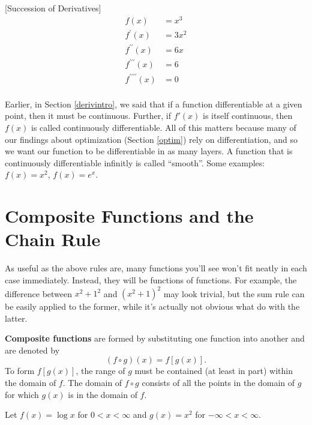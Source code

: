 \documentclass[]{book}
\theoremstyle{definition}
\theoremstyle{definition}
\theoremstyle{definition}
\theoremstyle{remark}
\begin{document}
[Succession of Derivatives]
\protect\hypertarget{exm:unnamed-chunk-16}{}{\label{exm:unnamed-chunk-16} {} }\begin{align*}
f(x) &=x^3\\
f^{\prime}(x) &=3x^2\\
f^{\prime\prime}(x) &=6x \\
f^{\prime\prime\prime}(x) &=6\\
f^{\prime\prime\prime\prime}(x) &=0\\
\end{align*}

Earlier, in Section \ref{derivintro}, we said that if a function differentiable at a given point, then it must be continuous. Further, if \(f'(x)\) is itself continuous, then \(f(x)\) is called continuously differentiable. All of this matters because many of our findings about optimization (Section \ref{optim}) rely on differentiation, and so we want our function to be differentiable in as many layers. A function that is continuously differentiable infinitly is called ``smooth''. Some examples: \(f(x) = x^2\), \(f(x) = e^x\).

\hypertarget{composite-functions-and-the-chain-rule}{%
\section{Composite Functions and the Chain Rule}\label{composite-functions-and-the-chain-rule}}

As useful as the above rules are, many functions you'll see won't fit neatly in each case immediately. Instead, they will be functions of functions. For example, the difference between \(x^2 + 1^2\) and \((x^2 + 1)^2\) may look trivial, but the sum rule can be easily applied to the former, while it's actually not obvious what do with the latter.

\textbf{Composite functions} are formed by substituting one function into another and are denoted by \[(f\circ g)(x)=f[g(x)].\] To form \(f[g(x)]\), the range of \(g\) must be contained (at least in part) within the domain of \(f\). The domain of \(f\circ g\) consists of all the points in the domain of \(g\) for which \(g(x)\) is in the domain of \(f\).

\protect\hypertarget{exm:unnamed-chunk-17}{}{\label{exm:unnamed-chunk-17} }Let \(f(x)=\log x\) for \(0<x<\infty\) and \(g(x)=x^2\) for \(-\infty<x<\infty\).
\end{document}
